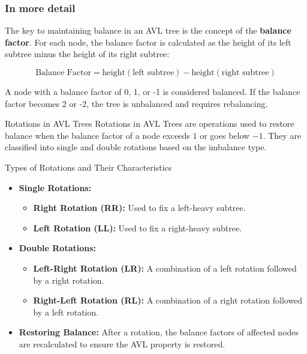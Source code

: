 \subsubsection{In more detail}


The key to maintaining balance in an AVL tree is the concept of the \textbf{balance factor}. For each node, the balance factor is calculated as the height of its left subtree minus the height of its right subtree:

\begin{equation*}
    \text{Balance Factor} = \text{height}(\text{left subtree}) - \text{height}(\text{right subtree})
\end{equation*}

A node with a balance factor of 0, 1, or -1 is considered balanced. If the balance factor becomes 2 or -2, the tree is unbalanced and requires rebalancing.

\begin{definition}[]{Rotations in AVL Trees}
    Rotations in AVL Trees are operations used to restore balance when the balance factor of a node exceeds $1$ or goes below $-1$. They are classified into single and double rotations based on the imbalance type.
\end{definition}

\begin{properties}[]{Types of Rotations and Their Characteristics}
    \begin{itemize}
        \item \textbf{Single Rotations:}
              \begin{itemize}
                  \item \textbf{Right Rotation (RR):} Used to fix a left-heavy subtree.
                  \item \textbf{Left Rotation (LL):} Used to fix a right-heavy subtree.
              \end{itemize}
        \item \textbf{Double Rotations:}
              \begin{itemize}
                  \item \textbf{Left-Right Rotation (LR):} A combination of a left rotation followed by a right rotation.
                  \item \textbf{Right-Left Rotation (RL):} A combination of a right rotation followed by a left rotation.
              \end{itemize}
        \item \textbf{Restoring Balance:} After a rotation, the balance factors of affected nodes are recalculated to ensure the AVL property is restored.
    \end{itemize}
\end{properties}

